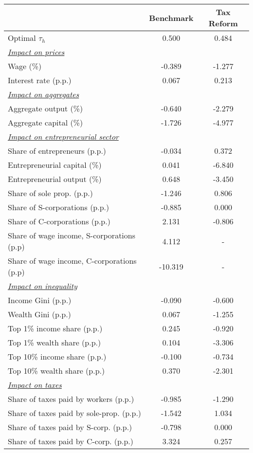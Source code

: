  \begin{tabular}{lcc} \hline 
  & Benchmark & Tax Reform \\ 
 \hline 
Optimal $\tau_h$ &    0.500 &    0.484 \\ \hline  
\multicolumn{3}{l}{\underline{\textit{Impact on prices}}}\\ 
Wage (\%) &   -0.389 &   -1.277 \\ 
Interest rate (p.p.) &    0.067 &    0.213 \\ 
\hline  
\multicolumn{3}{l}{\underline{\textit{Impact on aggregates}}}\\ 
Aggregate output (\%) &   -0.640 &   -2.279 \\ 
Aggregate capital (\%) &   -1.726 &   -4.977 \\ 
\hline  
\multicolumn{3}{l}{\underline{\textit{Impact on entrepreneurial sector}}}\\ 
Share of entrepreneurs (p.p.) &   -0.034 &    0.372 \\ 
Entrepreneurial capital (\%) &    0.041 &   -6.840 \\ 
Entrepreneurial output (\%) &    0.648 &   -3.450 \\ 
Share of sole prop. (p.p.) &   -1.246 &    0.806 \\ 
Share of S-corporations (p.p.) &   -0.885 &    0.000 \\ 
Share of C-corporations (p.p.) &    2.131 &   -0.806 \\ 
Share of wage income, S-corporations (p.p) &    4.112 & - \\ 
Share of wage income, C-corporations (p.p) &  -10.319 & - \\ 
\hline  
\multicolumn{3}{l}{\underline{\textit{Impact on inequality}}}\\ 
Income Gini (p.p.) &   -0.090 &   -0.600 \\ 
Wealth Gini (p.p.) &    0.067 &   -1.255 \\ 
Top 1\% income share (p.p.) &    0.245 &   -0.920 \\ 
Top 1\% wealth share (p.p.) &    0.104 &   -3.306 \\ 
Top 10\% income share (p.p.) &   -0.100 &   -0.734 \\ 
Top 10\% wealth share (p.p.) &    0.370 &   -2.301 \\ 
\hline  
\multicolumn{3}{l}{\underline{\textit{Impact on taxes}}}\\ 
Share of taxes paid by workers (p.p.) &   -0.985 &   -1.290 \\ 
Share of taxes paid by sole-prop. (p.p.) &   -1.542 &    1.034 \\ 
Share of taxes paid by S-corp. (p.p.) &   -0.798 &    0.000 \\ 
Share of taxes paid by C-corp. (p.p.) &    3.324 &    0.257 \\ 
\hline 
 \end{tabular} 
